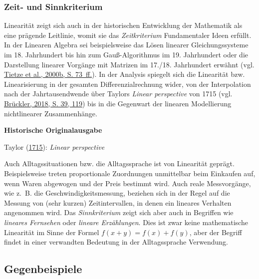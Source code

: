 \documentclass[
]{scrbook}
\renewenvironment{quote}{
  \list{}{
	\leftmargin0.2cm   %
    \rightmargin\leftmargin
      	\def\FrameCommand
    {%
        {\color{quoteColor}\vrule width 2pt}%
        \hspace{0pt}%
    }%
    \MakeFramed{\advance \hsize -\width \FrameRestore}    \color{quoteColor}
    }
  \item\relax
}
{\endlist\color{black}\endMakeFramed}
\theoremstyle{definition}
\theoremstyle{definition}
\theoremstyle{definition}
\theoremstyle{definition}
\theoremstyle{remark}
\begin{document}
\hypertarget{zeit--und-sinnkriterium}{%
\subsubsection{Zeit- und Sinnkriterium}\label{zeit--und-sinnkriterium}}

Linearität zeigt sich auch in der historischen Entwicklung der Mathematik als eine prägende Leitlinie, womit sie das \emph{Zeitkriterium} Fundamentaler Ideen erfüllt. In der Linearen Algebra sei beispielsweise das Lösen linearer Gleichungssysteme im 18. Jahrhundert bis hin zum Gauß-Algorithmus im 19. Jahrhundert oder die Darstellung linearer Vorgänge mit Matrizen im 17./18. Jahrhundert erwähnt (vgl. \protect\hyperlink{ref-Tietze:2000}{Tietze et al., 2000b, S. 73~ff.}). In der Analysis spiegelt sich die Linearität bzw. Linearisierung in der gesamten Differenzialrechnung wider, von der Interpolation nach der Jahrtausendwende über Taylors \emph{Linear perspective} von 1715 (vgl. \protect\hyperlink{ref-Bruckler:2018}{Brückler, 2018, S. 39, 119}) bis in die Gegenwart der linearen Modellierung nichtlinearer Zusammenhänge.

\begin{quote}
\textbf{Historische Originalausgabe}

Taylor (\protect\hyperlink{ref-Taylor:1715}{1715}): \emph{Linear perspective}
\end{quote}

Auch Alltagssituationen bzw. die Alltagssprache ist von Linearität geprägt. Beispielsweise treten proportionale Zuordnungen unmittelbar beim Einkaufen auf, wenn Waren abgewogen und der Preis bestimmt wird. Auch reale Messvorgänge, wie z.~B. die Geschwindigkeitsmessung, beziehen sich in der Regel auf die Messung von (sehr kurzen) Zeitintervallen, in denen ein lineares Verhalten angenommen wird. Das \emph{Sinnkriterium} zeigt sich aber auch in Begriffen wie \emph{lineares Fernsehen} oder \emph{lineare Erzählungen}. Dies ist zwar keine mathematische Linearität im Sinne der Formel \(f(x+y) = f(x) +f(y)\), aber der Begriff findet in einer verwandten Bedeutung in der Alltagssprache Verwendung.

\hypertarget{gegenbeispiele}{%
\subsection{Gegenbeispiele}\label{gegenbeispiele}}
\end{document}
